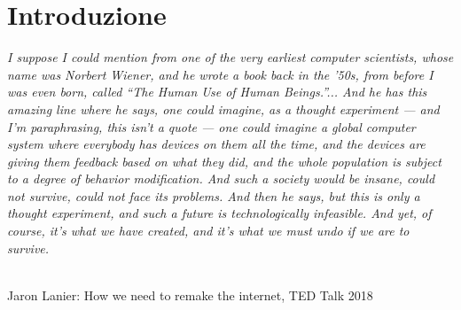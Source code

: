 \section{Introduzione}
\label{sec:Introduzione}

\begin{center}

\vspace{0.5cm}

\textit{I suppose I could mention from one of the very earliest computer scientists, 
whose name was Norbert Wiener, and he wrote a book back in the ’50s, 
from before I was even born, called “The Human Use of Human Beings.”...
And he has this amazing line where he says, one could imagine, as a thought experiment 
— and I’m paraphrasing, this isn’t a quote — 
one could imagine a global computer system where everybody has devices on them all the time, 
and the devices are giving them feedback based on what they did, 
and the whole population is subject to a degree of behavior modification. 
And such a society would be insane, could not survive, could not face its problems.
And then he says, but this is only a thought experiment, 
and such a future is technologically infeasible.
And yet, of course, it’s what we have created, 
and it’s what we must undo if we are to survive.}

\\

Jaron Lanier: How we need to remake the internet, TED Talk 2018

\vspace{0.5cm}

\end{center}

